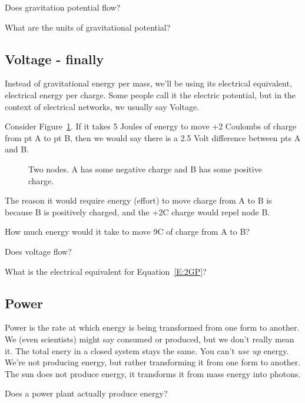 \begin{clevel}
Does gravitation potential flow?
\end{clevel}

\begin{blevel}
What are the units of gravitational potential?
\end{blevel}

\subsection{Voltage - finally}
Instead of gravitational energy per mass, we'll be using its electrical equivalent, electrical energy per charge. Some people call it the electric potential, but in the context of electrical networks, we usually say Voltage. \par

Consider Figure~\ref{F:2Va}. If it takes 5 Joules of energy to move +2 Coulombs of charge from pt A to pt B, then we would say there is a 2.5 Volt difference between pts A and B.

\begin{figure}[H]
\begin{center}
\caption{Two nodes. A has some negative charge and B has some positive charge.}
\label{F:2Va}
\end{center}
\end{figure}

The reason it would require energy (effort) to move charge from A to B is because B is positively charged, and the +2C charge would repel node B.
\par
\begin{blevel}
How much energy would it take to move 9C of charge from A to B?
\end{blevel}

\begin{alevel}
Does voltage flow?
\end{alevel}

\begin{blevel}
What is the electrical equivalent for Equation~\eqref{E:2GP}?
\end{blevel}

\subsection{Power}
Power is the rate at which energy is being transformed from one form to another. We (even scientists) might say consumed or produced, but we don't really mean it. The total enery in a closed system stays the same. You can't \emph{use up} energy. We're not producing energy, but rather transforming it from one form to another. The sun does not produce energy, it transforms it from mass energy into photons.
\par
\begin{alevel}
Does a power plant actually produce energy?
\end{alevel}

